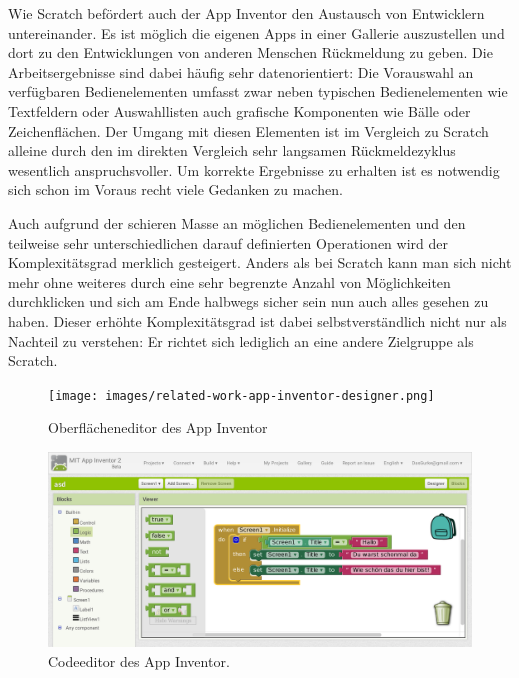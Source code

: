 Wie Scratch befördert auch der App Inventor den Austausch von Entwicklern untereinander. Es ist möglich die eigenen Apps in einer Gallerie auszustellen und dort zu den Entwicklungen von anderen Menschen Rückmeldung zu geben. Die Arbeitsergebnisse sind dabei häufig sehr datenorientiert: Die Vorauswahl an verfügbaren Bedienelementen umfasst zwar neben typischen Bedienelementen wie Textfeldern oder Auswahllisten auch grafische Komponenten wie Bälle oder Zeichenflächen. Der Umgang mit diesen Elementen ist im Vergleich zu Scratch alleine durch den im direkten Vergleich sehr langsamen Rückmeldezyklus wesentlich anspruchsvoller. Um korrekte Ergebnisse zu erhalten ist es notwendig sich schon im Voraus recht viele Gedanken zu machen.

Auch aufgrund der schieren Masse an möglichen Bedienelementen und den teilweise sehr unterschiedlichen darauf definierten Operationen wird der Komplexitätsgrad merklich gesteigert. Anders als bei Scratch kann man sich nicht mehr ohne weiteres durch eine sehr begrenzte Anzahl von Möglichkeiten durchklicken und sich am Ende halbwegs sicher sein nun auch alles gesehen zu haben. Dieser erhöhte Komplexitätsgrad ist dabei selbstverständlich nicht nur als Nachteil zu verstehen: Er richtet sich lediglich an eine andere Zielgruppe als Scratch.

\begin{figure}[p]
  \centering \texttt{[image: images/related-work-app-inventor-designer.png]}
  \caption{Oberflächeneditor des App Inventor}
  \label{fig:app-inventor-ui-designer}
\end{figure}

\begin{figure}[p]
  \centering \includegraphics[width=\textwidth]{images/related-work-app-inventor-blocks.png}
  \caption{Codeeditor des App Inventor.}
  \label{fig:app-inventor-block-designer}
\end{figure}

